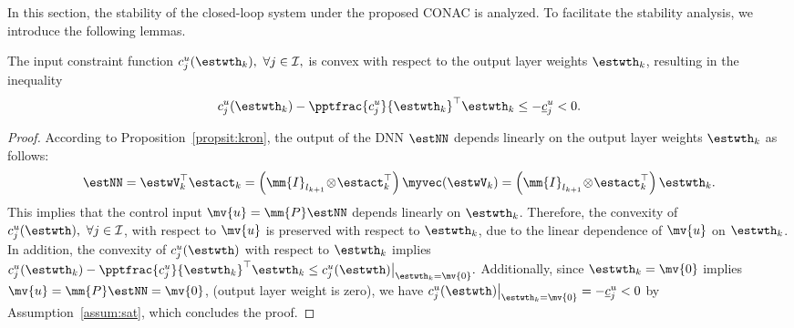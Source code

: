 \documentclass[letterpaper, journal]{IEEEtran}
\begin{document}
In this section, the stability of the closed-loop system under the proposed CONAC is analyzed.
To facilitate the stability analysis, we introduce the following lemmas.

\begin{lem} \label{lem:convexity:input:constraint}
  The input constraint function $c_j^{u}(\estwth_k),\ \forall j \in \mathcal{I},$ is convex with respect to the output layer weights $\estwth_k$, resulting in the inequality 
  \begin{equation*}
    c_j^{u}(\estwth_k) 
    - 
    \pptfrac{c_j^{u}}{\estwth_k}^\top 
    \estwth_k 
    \le 
    - \underline{c}_j^{u}
    <
    0
    .
  \end{equation*}
\end{lem}

\begin{proof}
  According to Proposition~\ref{propsit:kron}, the output of the DNN $\estNN$ depends linearly on the output layer weights $\estwth_k$ as follows:
  \begin{equation} \label{eq:NN:linear}
    \estNN
    =
    \estwV_k^\top
    \estact_k
    = 
    \left(
      \mm{I}_{l_{k+1}}
      \!
      \otimes
      \! 
      \estact_k^\top
    \right)
    \myvec(\estwV_k)
    = 
    \left(
      \mm{I}_{l_{k+1}} 
      \!
      \otimes 
      \!
      \estact_k^\top
    \right)
    \estwth_k
    .
  \end{equation}
  This implies that the control input $\mv{u}=\mm{P}\estNN$ depends linearly on $\estwth_k$.
  Therefore, the convexity of $c_j^u(\estwth),\ \forall j \in \mathcal{I}$, with respect to $\mv{u}$ is preserved with respect to $\estwth_k$, due to the linear dependence of $\mv{u}$ on $\estwth_k$.
  In addition, the convexity of $c_j^u(\estwth)$ with respect to $\estwth_k$ implies 
  $
    c_j^{u}(\estwth_k) 
    - 
    \pptfrac{c_j^{u}}{\estwth_k}^\top 
    \estwth_k 
    \le 
    c_j^{u}(\estwth)\big|_{\estwth_k=\mv{0}}
    .
  $
  Additionally, since $\estwth_k=\mv{0}$ implies $\mv{u}=\mm{P}\estNN=\mv{0}$, (\ie output layer weight is zero), we have $c_j^{u}(\estwth)\big|_{\estwth_k=\mv{0}}=-\underline{c}_j^{u}<0$ by Assumption~\ref{assum:sat}, which concludes the proof.
\end{proof}
\end{document}

